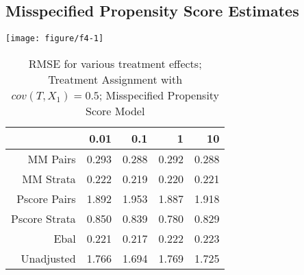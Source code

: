 \documentclass[11pt]{article}\usepackage[]{graphicx}\usepackage[]{color}
\makeatletter
\def\maxwidth{ %
  \ifdim\Gin@nat@width>\linewidth
    \linewidth
  \else
    \Gin@nat@width
  \fi
}
\newenvironment{knitrout}{}{} %
\makeatother
\begin{document}
\subsection{Misspecified Propensity Score Estimates}
\begin{knitrout}
\color{fgcolor}

{\centering \texttt{[image: figure/f4-1]} 

}



\end{knitrout}
\begin{table}[ht]
\centering
\begin{tabular}{rrrrr}
  \hline
 & 0.01 & 0.1 & 1 & 10 \\ 
  \hline
MM Pairs & 0.293 & 0.288 & 0.292 & 0.288 \\ 
  MM Strata & 0.222 & 0.219 & 0.220 & 0.221 \\ 
  Pscore Pairs & 1.892 & 1.953 & 1.887 & 1.918 \\ 
  Pscore Strata & 0.850 & 0.839 & 0.780 & 0.829 \\ 
  Ebal & 0.221 & 0.217 & 0.222 & 0.223 \\ 
  Unadjusted & 1.766 & 1.694 & 1.769 & 1.725 \\ 
   \hline
\end{tabular}
\caption{RMSE for various treatment effects; Treatment Assignment with $cov(T, X_1) = 0.5$; Misspecified Propensity Score Model} 
\label{tab:f4}
\end{table}
\end{document}
